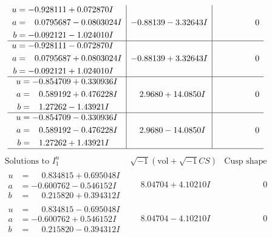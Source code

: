 \documentclass[1p]{elsarticle_modified}
\theoremstyle{definition}
\newcommand{\I}{\sqrt{-1}}
\begin{document}
$$\begin{array}{c|c|c}
\begin{aligned}
u &= -0.928111 + 0.072870 I \\
a &= \phantom{-}0.0795687 - 0.0803024 I \\
b &= -0.092121 - 1.024010 I\end{aligned}
 & -0.88139 - 3.32643 I & \phantom{-0.000000 } 0 \\ \hline\begin{aligned}
u &= -0.928111 - 0.072870 I \\
a &= \phantom{-}0.0795687 + 0.0803024 I \\
b &= -0.092121 + 1.024010 I\end{aligned}
 & -0.88139 + 3.32643 I & \phantom{-0.000000 } 0 \\ \hline\begin{aligned}
u &= -0.854709 + 0.330936 I \\
a &= \phantom{-}0.589192 + 0.476228 I \\
b &= \phantom{-}1.27262 - 1.43921 I\end{aligned}
 & \phantom{-}2.9680 + 14.0850 I & \phantom{-0.000000 } 0 \\ \hline\begin{aligned}
u &= -0.854709 - 0.330936 I \\
a &= \phantom{-}0.589192 - 0.476228 I \\
b &= \phantom{-}1.27262 + 1.43921 I\end{aligned}
 & \phantom{-}2.9680 - 14.0850 I & \phantom{-0.000000 } 0\\
 \hline 
 \end{array}$$\newpage$$\begin{array}{c|c|c}  
\text{Solutions to }I^u_{1}& \I (\text{vol} + \sqrt{-1}CS) & \text{Cusp shape}\\
 \hline 
\begin{aligned}
u &= \phantom{-}0.834815 + 0.695048 I \\
a &= -0.600762 - 0.546152 I \\
b &= \phantom{-}0.215820 + 0.394312 I\end{aligned}
 & \phantom{-}8.04704 + 4.10210 I & \phantom{-0.000000 } 0 \\ \hline\begin{aligned}
u &= \phantom{-}0.834815 - 0.695048 I \\
a &= -0.600762 + 0.546152 I \\
b &= \phantom{-}0.215820 - 0.394312 I\end{aligned}
 & \phantom{-}8.04704 - 4.10210 I & \phantom{-0.000000 } 0 \\ \hline\begin{aligned}

\end{aligned}
\end{array}$$
\end{document}
